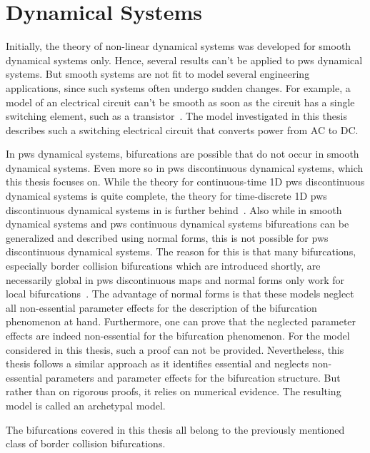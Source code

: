 \section{ Dynamical Systems}
\label{sec:state.pws}

Initially, the theory of non-linear dynamical systems was developed for smooth dynamical systems only.
Hence, several results can't be applied to \gls{pws} dynamical systems.
But smooth systems are not fit to model several engineering applications, since such systems often undergo sudden changes.
For example, a model of an electrical circuit can't be smooth as soon as the circuit has a single switching element, such as a transistor~\cite{ZhuMos03}.
The model investigated in this thesis describes such a switching electrical circuit that converts power from AC to DC.

In \gls{pws} dynamical systems, bifurcations are possible that do not occur in smooth dynamical systems.
Even more so in \gls{pws} discontinuous dynamical systems, which this thesis focuses on.
While the theory for continuous-time 1D \gls{pws} discontinuous dynamical systems is quite complete, the theory for time-discrete 1D \gls{pws} discontinuous dynamical systems in is further behind~\cite{Simpson16}.
Also while in smooth dynamical systems and \gls{pws} continuous dynamical systems bifurcations can be generalized and described using normal forms, this is not possible for \gls{pws} discontinuous dynamical systems.
The reason for this is that many bifurcations, especially border collision bifurcations which are introduced shortly, are necessarily global in \gls{pws} discontinuous maps and normal forms only work for local bifurcations~\cite{avrutin2019continuous}.
The advantage of normal forms is that these models neglect all non-essential parameter effects for the description of the bifurcation phenomenon at hand.
Furthermore, one can prove that the neglected parameter effects are indeed non-essential for the bifurcation phenomenon.
For the model considered in this thesis, such a proof can not be provided.
Nevertheless, this thesis follows a similar approach as it identifies essential and neglects non-essential parameters and parameter effects for the bifurcation structure.
But rather than on rigorous proofs, it relies on numerical evidence.
The resulting model is called an archetypal model.

The bifurcations covered in this thesis all belong to the previously mentioned class of border collision bifurcations.

